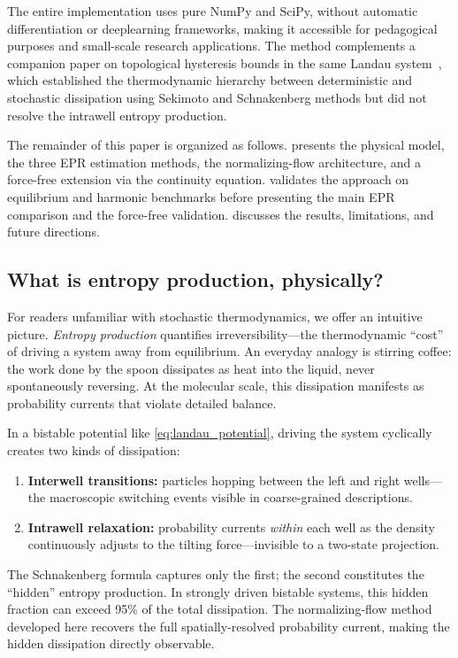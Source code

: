 The entire implementation uses pure NumPy and SciPy, without automatic differentiation or deep\-learning frameworks, making it accessible for pedagogical purposes and small-scale research applications.
The method complements a companion paper on topological hysteresis bounds in the same Landau system~\cite{FernandezCaballero2026}, which established the thermodynamic hierarchy between deterministic and stochastic dissipation using Sekimoto and Schnakenberg methods but did not resolve the intrawell entropy production.

The remainder of this paper is organized as follows.
 presents the physical model, the three EPR estimation methods, the normalizing-flow architecture, and a force-free extension via the continuity equation.
 validates the approach on equilibrium and harmonic benchmarks before presenting the main EPR comparison and the force-free validation.
 discusses the results, limitations, and future directions.

\subsection*{What is entropy production, physically?}

For readers unfamiliar with stochastic thermodynamics, we offer an intuitive picture.
\textit{Entropy production} quantifies irreversibility---the thermodynamic ``cost'' of driving a system away from equilibrium.
An everyday analogy is stirring coffee: the work done by the spoon dissipates as heat into the liquid, never spontaneously reversing.
At the molecular scale, this dissipation manifests as probability currents that violate detailed balance.

In a bistable potential like \cref{eq:landau_potential}, driving the system cyclically creates two kinds of dissipation:
\begin{enumerate}
    \item \textbf{Interwell transitions:} particles hopping between the left and right wells---the macroscopic switching events visible in coarse-grained descriptions.
    \item \textbf{Intrawell relaxation:} probability currents \emph{within} each well as the density continuously adjusts to the tilting force---invisible to a two-state projection.
\end{enumerate}
The Schnakenberg formula captures only the first; the second constitutes the ``hidden'' entropy production.
In strongly driven bistable systems, this hidden fraction can exceed \num{95}\% of the total dissipation.
The normalizing-flow method developed here recovers the full spatially-resolved probability current, making the hidden dissipation directly observable.
